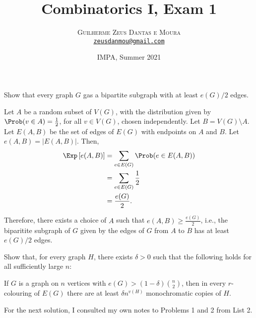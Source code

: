 \documentclass[10pt, a4paper]{article}
\title{\textbf{\textsf{Combinatorics I, Exam 1}}}
\author{\textsc{Guilherme Zeus Dantas e Moura}\\[2pt]\href{mailto:zeusdanmou@gmail.com}{\texttt{zeusdanmou@gmail.com}}}
\date{\vspace{-1ex}IMPA, Summer 2021}
\begin{document}
\maketitle

\begin{prob}\label{prob:1}
	Show that every graph $G$ gas a bipartite subgraph with at least $e(G)/2$ edges.
\end{prob}
\begin{sol}
	Let $A$ be a random subset of $V(G)$, with the distribution given by $\Prob(v \in A) = \frac{1}{2}$, for all $v \in V(G)$, chosen independently. Let $B = V(G)\setminus A$. Let $E(A, B)$ be the set of edges of $E(G)$ with endpoints on $A$ and $B$. Let $e(A, B) = |E(A, B)|$. Then,
	\begin{align*}
		\Exp\left[e(A, B)\right] &= \sum_{e \in E(G)} \Prob(e \in E(A, B))\\
								 &= \sum_{e \in E(G)} \frac{1}{2}\\
								 &= \frac{e(G)}{2}.
	\end{align*}

	Therefore, there exists a choice of $A$ such that $e(A, B) \geqslant \frac{e(G)}{2}$, i.e., the biparitite subgraph of $G$ given by the edges of $G$ from $A$ to $B$ has at least $e(G)/2$ edges.
\end{sol}

\newpage
\begin{prob}\label{prob:2}
	Show that, for every graph $H$, there exists $\delta > 0$ such that the following holds for all sufficiently large $n$:

	If  $G$ is a graph on $n$ vertices with $e(G) > (1 - \delta)\binom{n}{2}$, then in every  $r$-colouring of $E(G)$ there are at least $\delta n^{v(H)}$ monochromatic copies of $H$.
\end{prob}

\begin{rem}
	For the next solution, I consulted my own notes to Problems 1 and 2 from List 2.
\end{rem}
\end{document}
